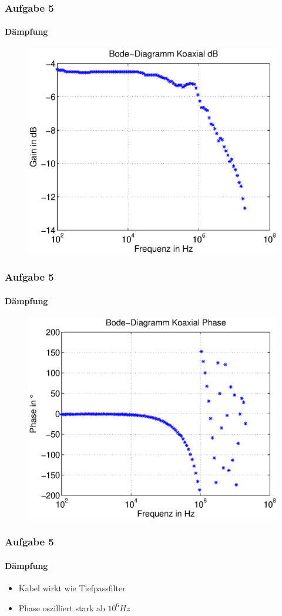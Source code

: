\begin{frame}
    \frametitle{Aufgabe 5}
    \framesubtitle{Dämpfung}
    \begin{figure}[H]
    \begin{center}
            \includegraphics[scale=0.6]{./img/5d_bode_dB.eps}
    \end{center}
    \end{figure}
\end{frame}
\begin{frame}
    \frametitle{Aufgabe 5}
    \framesubtitle{Dämpfung}
    \begin{figure}[H]
    \begin{center}
            \includegraphics[scale=0.6]{./img/5d_bode_phase.eps}
    \end{center}
    \end{figure}
\end{frame}
\begin{frame}
    \frametitle{Aufgabe 5}
    \framesubtitle{Dämpfung}
    \begin{itemize}
        \item Kabel wirkt wie Tiefpassfilter
        \item Phase oszilliert stark ab $10^6 Hz$
    \end{itemize}
\end{frame}
